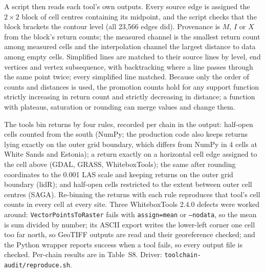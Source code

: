 \documentclass[11pt]{article}
\begin{document}
A script then reads each tool's own outputs. Every source edge is assigned the $2\times2$ block of cell centres containing its midpoint, and the script checks that the block brackets the contour level (all 23{,}566 edges did). Provenance is $M$, $I$ or $X$ from the block's return counts; the measured channel is the smallest return count among measured cells and the interpolation channel the largest distance to data among empty cells. Simplified lines are matched to their source lines by level, end vertices and vertex subsequence, with backtracking where a line passes through the same point twice; every simplified line matched. Because only the order of counts and distances is used, the promotion counts hold for any support function strictly increasing in return count and strictly decreasing in distance; a function with plateaus, saturation or rounding can merge values and change them.

The tools bin returns by four rules, recorded per chain in the output: half-open cells counted from the south (NumPy; the production code also keeps returns lying exactly on the outer grid boundary, which differs from NumPy in 4 cells at White Sands and Estonia); a return exactly on a horizontal cell edge assigned to the cell above (GDAL, GRASS, WhiteboxTools); the same after rounding coordinates to the 0.001 LAS scale and keeping returns on the outer grid boundary (lidR); and half-open cells restricted to the extent between outer cell centres (SAGA). Re-binning the returns with each rule reproduces that tool's cell counts in every cell at every site. Three WhiteboxTools 2.4.0 defects were worked around: \texttt{VectorPointsToRaster} fails with \texttt{assign=mean} or \texttt{--nodata}, so the mean is sum divided by number; its ASCII export writes the lower-left corner one cell too far north, so GeoTIFF outputs are read and their georeference checked; and the Python wrapper reports success when a tool fails, so every output file is checked. Per-chain results are in Table~S8. Driver: \texttt{toolchain-audit/reproduce.sh}.
\end{document}
